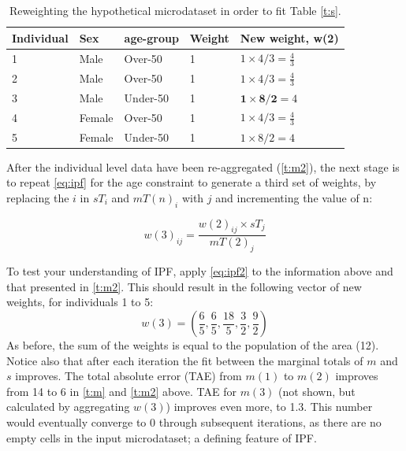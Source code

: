 \documentclass[a4paper,10pt]{article}
\begin{document}
\begin{table}[htbp]
\centering
\caption{Reweighting the hypothetical microdataset in order to fit
Table \ref{t:s}.}
\begin{tabular}{lllll}
\toprule
{Individual} & {Sex} & {age-group} & {Weight} &
{New weight, w(2)} \\ \midrule
1 & Male & Over-50 & 1 & $1 \times 4/3 = \frac{4}{3}$ \\
2 & Male & Over-50 & 1 & $1 \times 4/3 = \frac{4}{3}$ \\
3 & Male & Under-50 & 1 & $\textbf{1} \times
\textbf{8}/\textbf{2} = 4$ \\
4 & Female & Over-50 & 1 & $1 \times 4/3 = \frac{4}{3}$ \\
5 & Female & Under-50 & 1 & $1 \times 8/2 = 4$ \\
\bottomrule
\end{tabular}
\label{t:new-weights}
\end{table}

After the individual level data have been re-aggregated (\cref{t:m2}),
the next stage is to repeat \cref{eq:ipf} for the age constraint to generate a
third set of weights, by replacing
the $i$ in $sT_{i}$ and $mT(n)_{i}$ with $j$ and incrementing the value of n:

\begin{equation}
w(3)_{ij} = \frac{w(2)_{ij} \times sT_{j}}{mT(2)_{j}}
\label{eq:ipf2}
\end{equation}

To test your understanding of IPF, apply \cref{eq:ipf2} to the information above
and that presented in \cref{t:m2}.
This should result in the following vector of new weights, for individuals 1 to 5:
\begin{equation}
  w(3) = (\frac{6}{5}, \frac{6}{5}, \frac{18}{5}, \frac{3}{2}, \frac{9}{2})
\end{equation}
As before, the sum of the weights is equal to the population of the area (12).
Notice also that after each iteration the fit between the marginal
totals of $m$ and $s$
improves. The total absolute error (TAE)
from $m(1)$ to $m(2)$ improves from
14 to 6 in \cref{t:m} and \cref{t:m2} above. TAE for $m(3)$ (not shown,
but calculated by aggregating $w(3)$) improves even more, to 1.3.
This number would eventually converge to 0 through subsequent
iterations, as there are no empty cells in the input microdataset;
a defining feature of IPF.
\end{document}
